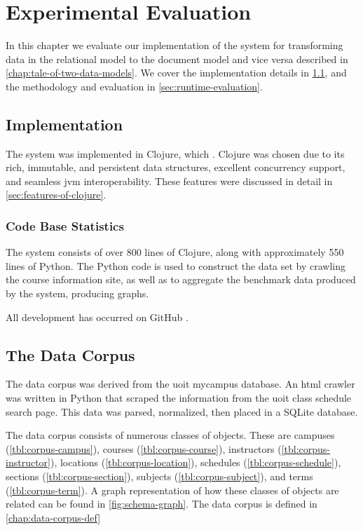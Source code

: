 \chapter{Experimental Evaluation}
\label{chap:experimental-evaluation}
	In this chapter we evaluate our implementation of the system for transforming data in the relational model to the document model and vice versa described in \cref{chap:tale-of-two-data-models}.  We cover the implementation details in \cref{sec:implementation}, and the methodology and evaluation in \cref{sec:runtime-evaluation}.
	
	\section{Implementation}
	\label{sec:implementation}
		The system was implemented in Clojure, which .  Clojure was chosen due to its rich, immutable, and persistent data structures, excellent concurrency support, and seamless \gls{jvm} interoperability.  These features were discussed in detail in \cref{sec:features-of-clojure}.
		
		\subsection{Code Base Statistics}
			The system consists of over 800 lines of Clojure, along with approximately 550 lines of Python.  The Python code is used to construct the data set by crawling the course information site, as well as to aggregate the benchmark data produced by the system, producing graphs.
			
			All development has occurred on GitHub \cite{molly-repo}. 
	
	\section{The Data Corpus}
	\label{sec:data-corpus}
		The data corpus was derived from the \gls{uoit} mycampus database.  An \gls{html} crawler was written in Python that scraped the information from the \gls{uoit} class schedule search page.  This data was parsed, normalized, then placed in a SQLite database.
		
		The data corpus consists of numerous classes of objects.  These are campuses (\cref{tbl:corpus-campus}), courses (\cref{tbl:corpus-course}), instructors (\cref{tbl:corpus-instructor}), locations (\cref{tbl:corpus-location}), schedules (\cref{tbl:corpus-schedule}), sections (\cref{tbl:corpus-section}), subjects (\cref{tbl:corpus-subject}), and terms (\cref{tbl:corpus-term}).  A graph representation of how these classes of objects are related can be found in \cref{fig:schema-graph}.  The data corpus is defined in \cref{chap:data-corpus-def}
		
